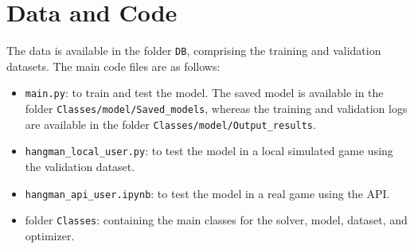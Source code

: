 \documentclass{report}
\begin{document}
\section*{Data and Code}
The data is available in the folder \texttt{DB}, comprising the training and validation datasets.
The main code files are as follows:
\begin{itemize}
    \item \texttt{main.py}: to train and test the model. 
    The saved model is available in the folder \texttt{Classes/model/Saved\_models}, 
    whereas the training and validation logs are available in the folder \texttt{Classes/model/Output\_results}.
    \item \texttt{hangman\_local\_user.py}: to test the model in a local simulated game using the validation dataset.
    \item \texttt{hangman\_api\_user.ipynb}: to test the model in a real game using the API.
    \item folder \texttt{Classes}: containing the main classes for the solver, model, dataset, and optimizer.
\end{itemize}
\end{document}
